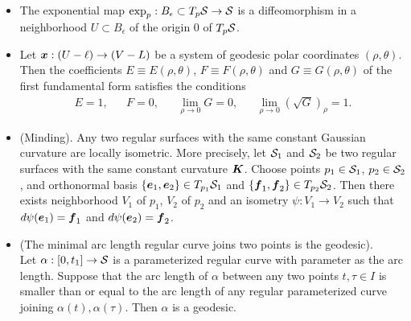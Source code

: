 \documentclass[11pt]{article}
\begin{document}
\begin{itemize}
\item  \begin{proposition}\label{prop: exp_map_diffeomorph}
The exponential map $\exp_{p}: B_{\epsilon}\subset T_{p}{\mathcal S} \rightarrow {\mathcal S}$ is a diffeomorphism in a neighborhood $U\subset B_{\epsilon}$ of the origin $0$ of $T_{p}{\mathcal S}$. 
\end{proposition}\vspace{10pt}

 \item \begin{proposition}\label{prop: exp_map_first_fund}
Let $\boldsymbol{x}: (U-\ell)\rightarrow (V-L)$  be a system of geodesic polar coordinates $(\rho, \theta)$. Then the coefficients $E\equiv E(\rho, \theta)$, $F\equiv F(\rho, \theta)$ and $G\equiv G(\rho, \theta)$ of the first fundamental form satisfies the conditions
\begin{align*}
E = 1, && F=0, && \lim_{\rho \rightarrow 0}G = 0, && \lim_{\rho\rightarrow 0}(\sqrt{G})_{\rho} = 1.
\end{align*}
\end{proposition}\vspace{10pt}

\item \begin{theorem}\label{thm: minding_thm}
(Minding). Any two regular surfaces with the same constant Gaussian curvature are locally isometric. More precisely, let ${\mathcal S}_{1}$ and ${\mathcal S}_{2}$ be two regular surfaces with the same constant curvature $\boldsymbol{K}$. Choose points $p_{1}\in {\mathcal S}_{1}$, $p_{2}\in {\mathcal S}_{2}$, and orthonormal basis $\left\{\boldsymbol{e}_{1}, \boldsymbol{e}_{2}\right\}\in T_{p_{1}}{\mathcal S}_{1}$ and $\left\{\boldsymbol{f}_{1}, \boldsymbol{f}_{2}\right\}\in T_{p_{2}}{\mathcal S}_{2}$. Then there exists neighborhood $V_{1}$ of $p_{1}$, $V_{2}$ of $p_{2}$ and an isometry $\psi: V_{1}\rightarrow V_{2}$ such that $d\psi(\boldsymbol{e}_{1}) = \boldsymbol{f}_{1} $ and  $d\psi(\boldsymbol{e}_{2}) = \boldsymbol{f}_{2} $.
\end{theorem}\vspace{20pt}


\item \begin{proposition}\label{prop: regular_minimal_arc}
(The minimal arc length regular curve joins two points is the geodesic).\\ 
Let $\alpha: [0,t_{1}]\rightarrow {\mathcal S}$ is a parameterized regular curve with parameter as the arc length. Suppose that the arc length of $\alpha$ between any two points $t, \tau \in I$ is smaller than or equal to the arc length of any regular parameterized curve joining $\alpha(t), \alpha(\tau)$. Then $\alpha$ is a geodesic. 
\end{proposition}


\end{itemize}
\end{document}
